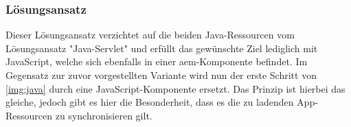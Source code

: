 \subsubsection{Lösungsansatz }
\label{sec:ansatz-javascript}
Dieser Lösungsansatz verzichtet auf die beiden Java-Ressourcen vom Lösungsansatz "Java-Servlet" und erfüllt das gewünschte Ziel lediglich mit JavaScript, welche sich ebenfalls in einer \ac{aem}-Komponente befindet. Im Gegensatz zur zuvor vorgestellten Variante wird nun der erste Schritt von \autoref{img:java} durch eine JavaScript-Komponente ersetzt. Das Prinzip ist hierbei das gleiche, jedoch gibt es hier die Besonderheit, dass es die zu ladenden App-Ressourcen zu synchronisieren gilt.


